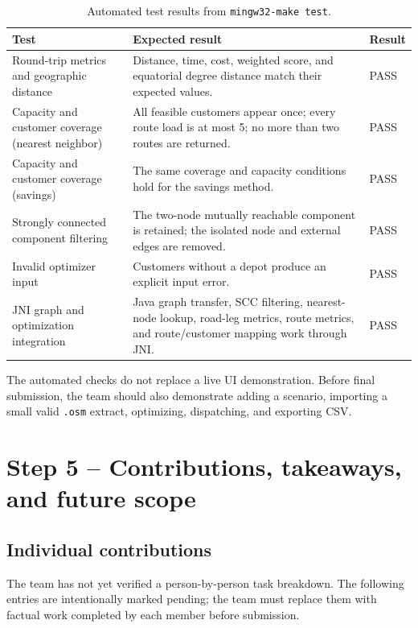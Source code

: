 \documentclass[11pt,a4paper]{article}
\begin{document}
\begin{table}[h]
\centering
\small
\begin{tabularx}{\textwidth}{@{}p{}X p{}@{}}
\toprule
\textbf{Test} & \textbf{Expected result} & \textbf{Result}\\
\midrule
Round-trip metrics and geographic distance
    & Distance, time, cost, weighted score, and equatorial degree distance
      match their expected values.
    & PASS\\
Capacity and customer coverage (nearest neighbor)
    & All feasible customers appear once; every route load is at most 5; no
      more than two routes are returned.
    & PASS\\
Capacity and customer coverage (savings)
    & The same coverage and capacity conditions hold for the savings method.
    & PASS\\
Strongly connected component filtering
    & The two-node mutually reachable component is retained; the isolated
      node and external edges are removed.
    & PASS\\
Invalid optimizer input
    & Customers without a depot produce an explicit input error.
    & PASS\\
JNI graph and optimization integration
    & Java graph transfer, SCC filtering, nearest-node lookup, road-leg
      metrics, route metrics, and route/customer mapping work through JNI.
    & PASS\\
\bottomrule
\end{tabularx}
\caption{Automated test results from \texttt{mingw32-make test}.}
\end{table}

The automated checks do not replace a live UI demonstration. Before final
submission, the team should also demonstrate adding a scenario, importing a
small valid \texttt{.osm} extract, optimizing, dispatching, and exporting CSV.

\section{Step 5 -- Contributions, takeaways, and future scope}

\subsection{Individual contributions}
The team has not yet verified a person-by-person task breakdown. The
following entries are intentionally marked pending; the team must replace
them with factual work completed by each member before submission.
\end{document}
